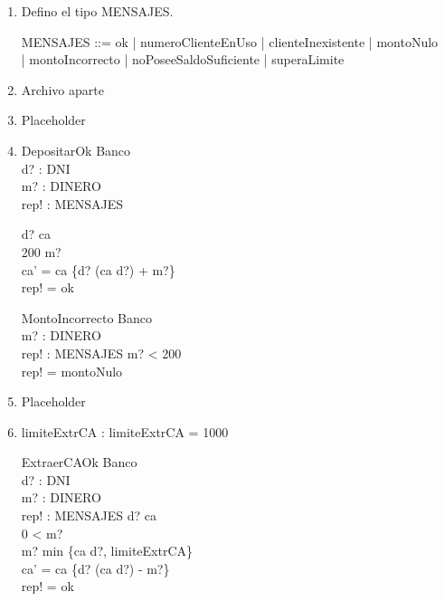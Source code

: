 \documentclass[11pt]{article}
\begin{document}
  \begin{enumerate}
    \item 
    Defino el tipo MENSAJES.
    \begin{zed}
      MENSAJES ::= ok | numeroClienteEnUso | clienteInexistente | montoNulo \\
                      | montoIncorrecto | noPoseeSaldoSuficiente | superaLimite
    \end{zed}
    \item Archivo aparte
    \item Placeholder
    \item
    \begin{schema}{DepositarOk}
      \Delta Banco \\
      d? : DNI \\
      m? : DINERO \\
      rep! : MENSAJES

      \where
      d? \in \dom ca \\
      200 \leq m? \\
      ca' = ca \oplus \{d? \mapsto (ca \; d?) + m?\} \\
      rep! = ok
    \end{schema}

    \begin{schema}{MontoIncorrecto}
      \Xi Banco \\
      m? : DINERO \\
      rep! : MENSAJES
      \where
      m? < 200 \\
      rep! = montoNulo
    \end{schema}
    \item Placeholder
    \item 
    \begin{axdef}
      limiteExtrCA : \nat
      \where
      limiteExtrCA = 1000
    \end{axdef}

    \begin{schema}{ExtraerCAOk}
      \Delta Banco \\
      d? : DNI \\
      m? : DINERO \\
      rep! : MENSAJES 
      \where
      d? \in \dom ca \\
      0 < m?\\
      m? \leq min \{ca \; d?, \; limiteExtrCA\}\\
      ca' = ca \oplus \{d? \mapsto (ca \; d?) - m?\} \\
      rep! = ok
    \end{schema}
    

\end{enumerate}
\end{document}
